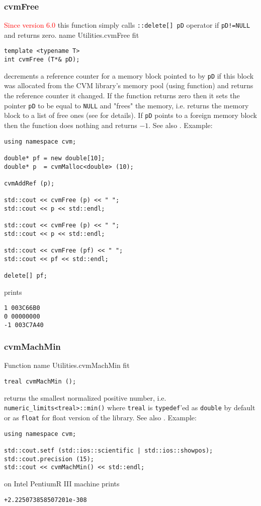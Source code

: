 \subsubsection{cvmFree}
\textcolor{red}{Since version 6.0} %
this function simply calls \verb"::delete[] pD" operator if \verb"pD!=NULL" and returns zero.%
\pdfdest name {Utilities.cvmFree} fit
\begin{verbatim}
template <typename T>
int cvmFree (T*& pD);
\end{verbatim}
decrements a reference counter for a memory block pointed to
by \verb"pD" if this block was allocated from the CVM library's
memory pool (using  function)
and returns the reference counter it changed.
If the function returns zero then it sets the pointer
\verb"pD" to be equal to \verb"NULL" and "frees" the memory, i.e.
returns the memory block to a list of free ones (see  for details).
If \verb"pD" points to a foreign memory block then
the function does nothing and returns $-1$.
See also .
Example:
\begin{Verbatim}
using namespace cvm;

double* pf = new double[10];
double* p  = cvmMalloc<double> (10);

cvmAddRef (p);

std::cout << cvmFree (p) << " ";
std::cout << p << std::endl;

std::cout << cvmFree (p) << " ";
std::cout << p << std::endl;

std::cout << cvmFree (pf) << " ";
std::cout << pf << std::endl;

delete[] pf;
\end{Verbatim}
prints
\begin{Verbatim}
1 003C66B0
0 00000000
-1 003C7A40
\end{Verbatim}
\newpage



\subsubsection{cvmMachMin}
Function%
\pdfdest name {Utilities.cvmMachMin} fit
\begin{verbatim}
treal cvmMachMin ();
\end{verbatim}
returns the smallest normalized positive number,
i.e. \verb"numeric_limits<treal>::min()"
where \verb"treal" is \verb"typedef"'ed as \verb"double"
by default or as \verb"float" for float version of the library.
See also .
Example:
\begin{Verbatim}
using namespace cvm;

std::cout.setf (std::ios::scientific | std::ios::showpos);
std::cout.precision (15);
std::cout << cvmMachMin() << std::endl;
\end{Verbatim}
on Intel Pentium\textcircled{\scriptsize{R}} III machine prints
\begin{Verbatim}
+2.225073858507201e-308
\end{Verbatim}
\newpage


